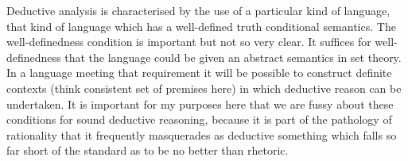 Deductive analysis is characterised by the use of a particular kind of language, that kind of language which has a well-defined truth conditional semantics.
The well-definedness condition is important but not so very clear.
It suffices for well-definedness that the language could be given an abstract semantics in set theory.
In a language meeting that requirement it will be possible to construct definite contexts (think consistent set of premises here) in which deductive reason can be undertaken.
It is important for my purposes here that we are fussy about these conditions for sound deductive reasoning, because it is part of the pathology of rationality that it frequently masquerades as deductive something which falls so far short of the standard as to be no better than rhetoric.

 
